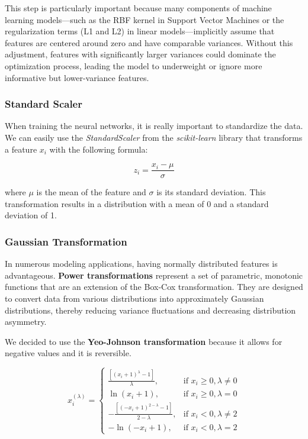 \documentclass[11pt,english,a4paper,hidelinks]{book}
\begin{document}
\vspace{0.5cm}
\noindent This step is particularly important because many components of machine learning models—such as the RBF kernel in Support Vector Machines or the regularization terms (L1 and L2) in linear models—implicitly assume that features are centered around zero and have comparable variances. Without this adjustment, features with significantly larger variances could dominate the optimization process, leading the model to underweight or ignore more informative but lower-variance features.

\subsubsection{Standard Scaler}
When training the neural networks, it is really important to standardize the data. We can easily use the \textit{StandardScaler} from the \textit{scikit-learn} library that transforms a feature \(x_i\) with the following formula:

\begin{equation}
z_i = \frac{x_i - \mu}{\sigma}
\end{equation}

\noindent where \(\mu\) is the mean of the feature and \(\sigma\) is its standard deviation. This transformation results in a distribution with a mean of 0 and a standard deviation of 1.



\subsubsection{Gaussian Transformation}

In numerous modeling applications, having normally distributed features is advantageous. \textbf{Power transformations} represent a set of parametric, monotonic functions that are an extension of the Box-Cox transformation. They are designed to convert data from various distributions into approximately Gaussian distributions, thereby reducing variance fluctuations and decreasing distribution asymmetry. 

\vspace{0.5cm}
\noindent We decided to use the \textbf{Yeo-Johnson transformation} because it allows for negative values and it is reversible.

\begin{equation}
x_i^{(\lambda)} =
\begin{cases}
\frac{[(x_i + 1)^\lambda - 1]}{\lambda}, & \text{if } x_i \geq 0, \lambda \neq 0 \\
\ln(x_i + 1), & \text{if } x_i \geq 0, \lambda = 0 \\
-\frac{[(-x_i + 1)^{2 - \lambda} - 1]}{2 - \lambda}, & \text{if } x_i < 0, \lambda \neq 2 \\
-\ln(-x_i + 1), & \text{if } x_i < 0, \lambda = 2
\end{cases}
\end{equation}
\end{document}
